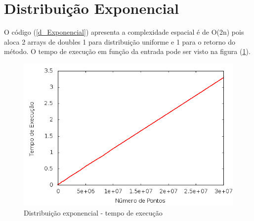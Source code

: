 \section{Distribuição Exponencial}
O código (\ref{d_Exponencial}) apresenta a complexidade espacial é de O(2n) pois aloca 2 arrays de doubles 1 para distribuição uniforme e 1 para o retorno do método. O tempo de execução em função da entrada pode ser visto na figura (\ref{TempExecExp}).
\begin{figure}[!htb]
\centering
\begin{minipage}[b]{0.45\linewidth}
\includegraphics[width=\linewidth]{./img/AspectosNumericos/ExponencialComplexidade.png}
\caption{Distribuição exponencial - tempo de execução}
\label{TempExecExp}
\end{minipage} \hfill
\end{figure}

